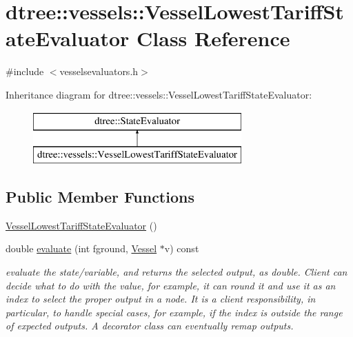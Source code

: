 \hypertarget{classdtree_1_1vessels_1_1_vessel_lowest_tariff_state_evaluator}{}\section{dtree\+::vessels\+::Vessel\+Lowest\+Tariff\+State\+Evaluator Class Reference}
\label{classdtree_1_1vessels_1_1_vessel_lowest_tariff_state_evaluator}


{\ttfamily \#include $<$vesselsevaluators.\+h$>$}

Inheritance diagram for dtree\+::vessels\+::Vessel\+Lowest\+Tariff\+State\+Evaluator\+:\begin{figure}[H]
\begin{center}
\leavevmode
\includegraphics[height=2.000000cm]{d1/d8a/classdtree_1_1vessels_1_1_vessel_lowest_tariff_state_evaluator}
\end{center}
\end{figure}
\subsection*{Public Member Functions}
\begin{DoxyCompactItemize}
\item 
\mbox{\hyperlink{classdtree_1_1vessels_1_1_vessel_lowest_tariff_state_evaluator_a6a0a9e479d7fdd34f6bface533ecc6ea}{Vessel\+Lowest\+Tariff\+State\+Evaluator}} ()
\item 
double \mbox{\hyperlink{classdtree_1_1vessels_1_1_vessel_lowest_tariff_state_evaluator_a3dafcca2d3db56b18fb5c42199b2e1ec}{evaluate}} (int fground, \mbox{\hyperlink{class_vessel}{Vessel}} $\ast$v) const
\begin{DoxyCompactList}\small\item\em evaluate the state/variable, and returns the selected output, as double. Client can decide what to do with the value, for example, it can round it and use it as an index to select the proper output in a node. It is a client responsibility, in particular, to handle special cases, for example, if the index is outside the range of expected outputs. A decorator class can eventually remap outputs. \end{DoxyCompactList}\end{DoxyCompactItemize}



